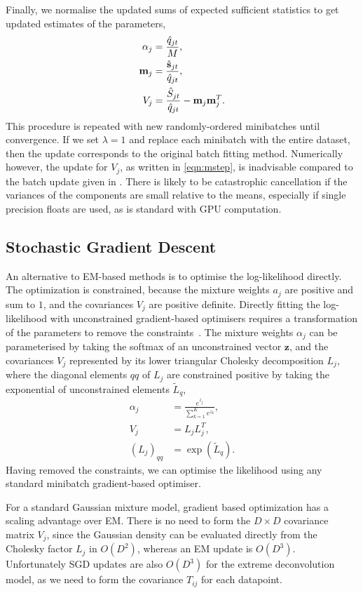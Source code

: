 Finally, we normalise the updated sums of expected sufficient statistics to get updated estimates of the parameters,
\begin{align}
\alpha_{j} &= \frac{\hat{q}_{jt}}{M}, \\
\mathbf{m}_{j} &= \frac{\hat{\mathbf{s}}_{jt}}{\hat{q}_{jt}}, \\
V_{j} &= \frac{\hat{S}_{jt}}{\hat{q}_{jt}} - \mathbf{m}_{j} \mathbf{m}_{j}^T.
\label{eqn:mstep}
\end{align}
This procedure is repeated with new randomly-ordered minibatches until convergence.
If we set $\lambda=1$ and replace each minibatch with the entire dataset,
then the update corresponds to the original batch fitting method.
Numerically however, the update for $V_j$, as written in \eqref{eqn:mstep}, is inadvisable compared to the batch update given in \cite{bovyExtremeDeconvolutionInferring2011}. There is likely to be catastrophic cancellation if the variances of the components are small relative to the means, especially if single precision floats are used, as is standard with GPU computation.

\subsection{Stochastic Gradient Descent}

An alternative to EM-based methods is to optimise the log-likelihood directly.
The optimization is constrained, because the mixture weights $a_j$ are positive and sum to $1$, and the covariances $V_j$ are positive definite.
Directly fitting the log-likelihood with unconstrained gradient-based optimisers requires a transformation of the parameters to remove the constraints~\cite{williams1996}.
The mixture weights $\alpha_j$ can be parameterised by taking the softmax of an unconstrained vector $\mathbf{z}$, and the covariances $V_j$ represented by its lower triangular Cholesky decomposition $L_j$, where the diagonal elements $qq$ of $L_j$ are constrained positive by taking the exponential of unconstrained elements $\tilde{L}_q$,
\begin{align}
\alpha_j &= \frac{e^{z_j}}{\sum_{k=1}^K e^{z_k}}, \\
V_j &= L_jL_j^T, \\
(L_j)_{qq} &= \exp({\tilde{L}_q}).
\end{align}
Having removed the constraints, we can optimise the likelihood using any standard minibatch gradient-based optimiser.

For a standard Gaussian mixture model, gradient based optimization has a scaling advantage over EM\@. There is no need to form the $D\!\times\!D$ covariance matrix $V_j$, since the Gaussian density can be evaluated directly from the Cholesky factor $L_j$ in $O(D^2)$, whereas an EM update is $O(D^3)$.
Unfortunately SGD updates are also $O(D^3)$ for the extreme deconvolution model, as we need to form the covariance $T_{ij}$ for each datapoint.
